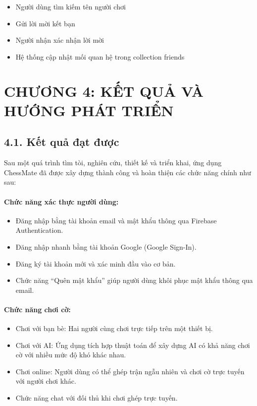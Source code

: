 \documentclass[a4paper,12pt]{article}
\begin{document}
\begin{itemize}[label=·]
    \item Người dùng tìm kiếm tên người chơi
    \item Gửi lời mời kết bạn
    \item Người nhận xác nhận lời mời
    \item Hệ thống cập nhật mối quan hệ trong collection friends
\end{itemize}


\section*{\centering \textbf{CHƯƠNG 4: KẾT QUẢ VÀ HƯỚNG PHÁT TRIỂN}} %

\subsection*{4.1. Kết quả đạt được} %

\justify
\noindent Sau một quá trình tìm tòi, nghiên cứu, thiết kế và triển khai, ứng dụng ChessMate đã được xây dựng thành công và hoàn thiện các chức năng chính như sau:

\paragraph{\textbf{Chức năng xác thực người dùng:}} %
\begin{itemize}[label=·]
    \item Đăng nhập bằng tài khoản email và mật khẩu thông qua Firebase Authentication.
    \item Đăng nhập nhanh bằng tài khoản Google (Google Sign-In).
    \item Đăng ký tài khoản mới và xác minh đầu vào cơ bản.
    \item Chức năng “Quên mật khẩu” giúp người dùng khôi phục mật khẩu thông qua email.
\end{itemize}

\paragraph{\textbf{Chức năng chơi cờ:}} %
\begin{itemize}[label=·]
    \item Chơi với bạn bè: Hai người cùng chơi trực tiếp trên một thiết bị.
    \item Chơi với AI: Ứng dụng tích hợp thuật toán để xây dựng AI có khả năng chơi cờ với nhiều mức độ khó khác nhau.
    \item Chơi online: Người dùng có thể ghép trận ngẫu nhiên và chơi cờ trực tuyến với người chơi khác.
    \item Chức năng chat với đối thủ khi chơi ghép trực tuyến.
\end{itemize}
\end{document}
